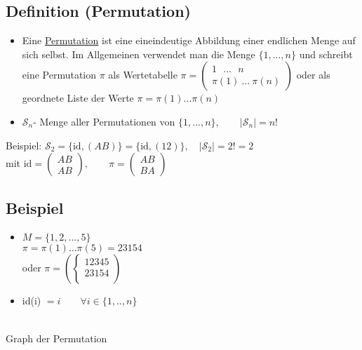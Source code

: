 \documentclass[12pt,titlepage, pdf]{article}
\newcommand{\uline}[1]{\underline{#1}}
\newcommand{\id}{\textrm{id}}
\renewcommand{\>}{\rightarrow}
\renewcommand{\*}{\cdot}
\begin{document}
\subsection{Definition (Permutation)}	
\begin{itemize}
	\item Eine \uline{Permutation} ist eine eineindeutige Abbildung einer endlichen Menge auf sich selbst. Im Allgemeinen verwendet man die Menge $\{1,...,n\}$ und schreibt eine Permutation $\pi$ als Wertetabelle $\pi = \begin{pmatrix}
	1~~~...~~~n\\\pi(1)~...~\pi(n)
	\end{pmatrix}$ oder als geordnete Liste der Werte $\pi = \pi(1)... \pi(n)$ 
	\item $\mathscr{S}_n$- Menge aller Permutationen von $\{1,...,n \},\qquad | \mathscr{S}_n| = n!$
\end{itemize}
Beispiel: $\mathscr{S}_2=\{\id,(AB)\}=\{\id,(12)\},\quad|\mathscr{S}_2|=2!=2$\\ mit $\id=\begin{pmatrix}
AB\\AB
\end{pmatrix},\qquad \pi=\begin{pmatrix}
AB\\BA
\end{pmatrix}$
\subsection{Beispiel}
\begin{minipage}[c]{0.5\textwidth}
	\begin{itemize}
		\item $M = \{1,2,...,5\}$ \\
		$\pi = \pi(1)...\pi(5) = 23154$\\
		oder $\pi = (\begin{cases}
		12345 \\
		23154 \\
		\end{cases})$
		\item id(i) $= i \qquad \forall i \in \{1,..,n\}$
	\end{itemize}
\end{minipage}
\begin{minipage}[c]{0.5\textwidth}
	\\
	Graph der Permutation
\end{minipage}
\end{document}
